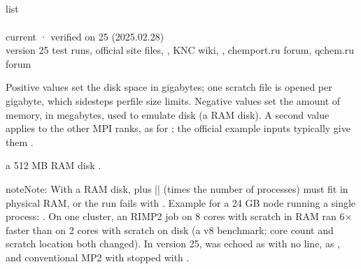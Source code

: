 \documentclass[letterpaper,10pt,english,openany,oneside]{sphinxmanual}
\begin{document}
\subsection{}
\label{\detokenize{reference/system:disk}}\label{\detokenize{reference/system:system-disk}}
\ignorespaces 
\sphinxAtStartPar
{} list\\
 \\
 current · verified on 25 (2025.02.28)\\
 version 25 test runs, official site files, , KNC wiki, , chemport.ru forum, qchem.ru forum

\sphinxAtStartPar
Positive values set the disk space in gigabytes; one scratch file is opened per gigabyte, which sidesteps
per\sphinxhyphen{}file size limits. Negative values set the amount of memory, in megabytes, used to emulate disk
(a RAM disk). A second value applies to the other MPI ranks, as for ; the official example inputs typically give
them .

\sphinxAtStartPar
{} a 512 MB RAM disk .

\begin{sphinxadmonition}{note}{Note:}
\sphinxAtStartPar
With a RAM disk,  plus || (times the number of processes) must fit in physical RAM, or the run
fails with . Example for a 24 GB node running a single process: .
On one cluster, an RI\sphinxhyphen{}MP2 job on 8 cores with scratch in RAM ran 6× faster than on 2 cores with scratch on
disk (a v8 benchmark; core count and scratch location both changed).
In version 25,  was echoed as  with no  line,  as
, and conventional MP2 with  stopped with .
\end{sphinxadmonition}
\end{document}

